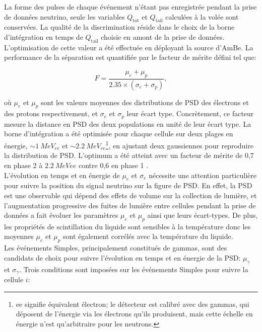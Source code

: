La forme des pulses de chaque événement n'étant pas enregistrée pendant la prise de données neutrino, seule les variables $Q_\textrm{tot}$ et $Q_\textrm{tail}$ calculées à la volée sont conservées. La qualité de la discrimination réside dans le choix de la borne d'intégration en temps de $Q_\textrm{tail}$ choisie en amont de la prise de données. L'optimisation de cette valeur a été effectuée en déployant la source d'AmBe. La performance de la séparation est quantifiée par le facteur de mérite défini tel que:

\begin{equation}
    F = \frac{\mu_e + \mu_p}{2.35 \times (\sigma_e + \sigma_p)},
\end{equation}

\bigbreak

où $\mu_e$ et $\mu_p$ sont les valeurs moyennes des distributions de PSD des électrons et des protons respectivement, et  $\sigma_e$ et $\sigma_p$ leur écart type. Concrètement, ce facteur mesure la distance en PSD des deux populations en unité de leur écart type. La borne d'intégration a été optimisée pour chaque cellule sur deux plages en énergie, $\sim \SI{1}{MeV_{ee}}$ et $\sim \SI{2.2}{MeV_{ee}}$\footnote{\og ee \fg{} signifie équivalent électron; le détecteur est calibré avec des gammas, qui déposent de l'énergie via les électrons qu'ils produisent, mais cette échelle en énergie n'est qu'arbitraire pour les neutrons.}, en ajustant deux gaussiennes pour reproduire la distribution de PSD. L'optimum a été atteint avec un facteur de mérite de 0,7 en phase 2 à $\SI{2,2}{MeVee}$ \cite{docdb409} contre 0,6 en phase 1 \cite{docdb155}.\\

L'évolution en temps et en énergie de $\mu_e$ et $\sigma_e$ nécessite une attention particulière pour suivre la position du signal neutrino sur la figure de PSD. En effet, la PSD est une observable qui dépend des effets de volume sur la collection de lumière, et l'augmentation progressive des fuites de lumière entre cellules pendant la prise de données a fait évoluer les paramètres $\mu_e$ et $\mu_p$ ainsi que leurs écart-types. De plus, les propriétés de scintillation du liquide sont sensibles à la température donc les moyennes $\mu_e$ et $\mu_p$ sont également corrélés avec la température du liquide.\\

Les événements Simples, principalement constitués de gammas, sont des candidats de choix pour suivre l'évolution en temps et en énergie de la PSD: $\mu_\gamma$ et $\sigma_\gamma$. Trois conditions sont imposées sur les événements Simples pour suivre la cellule $i$:

